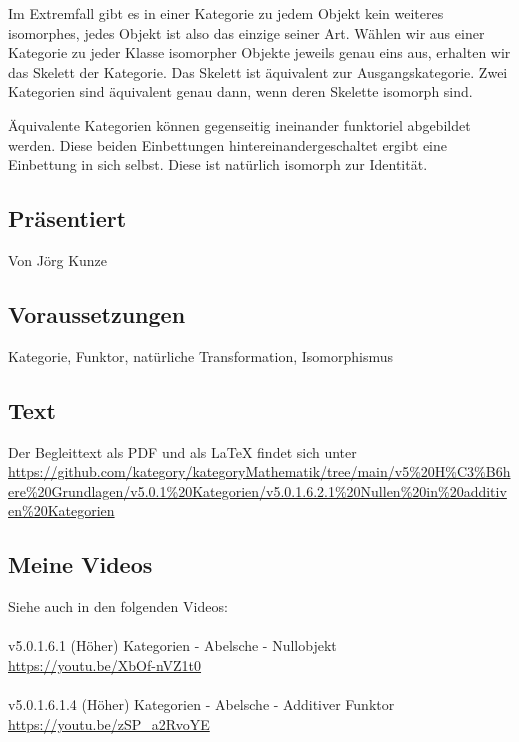\documentclass[a4paper]{amsart}
\theoremstyle{definition}
\begin{document}
Im Extremfall gibt es in einer Kategorie zu jedem Objekt kein weiteres isomorphes, jedes Objekt ist also das einzige seiner Art. Wählen wir aus einer Kategorie zu jeder Klasse isomorpher Objekte jeweils genau eins aus, erhalten wir das Skelett der Kategorie. Das Skelett ist äquivalent zur Ausgangskategorie. Zwei Kategorien sind äquivalent genau dann, wenn deren Skelette isomorph sind.

Äquivalente Kategorien können gegenseitig ineinander funktoriel abgebildet werden. Diese beiden Einbettungen hintereinandergeschaltet ergibt eine Einbettung in sich selbst. Diese ist natürlich isomorph zur Identität.

\subsection*{Präsentiert}
Von Jörg Kunze

\subsection*{Voraussetzungen}
Kategorie, Funktor, natürliche Transformation, Isomorphismus

\subsection*{Text}
Der Begleittext als PDF und als LaTeX findet sich unter
{\tiny
   \url{https://github.com/kategory/kategoryMathematik/tree/main/v5%20H%C3%B6here%20Grundlagen/v5.0.1%20Kategorien/v5.0.1.6.2.1%20Nullen%20in%20additiven%20Kategorien}
}

\subsection*{Meine Videos}
Siehe auch in den folgenden Videos:\\ 
\\
v5.0.1.6.1 (Höher) Kategorien - Abelsche - Nullobjekt\\
\url{https://youtu.be/XbOf-nVZ1t0}\\
\\
v5.0.1.6.1.4 (Höher) Kategorien - Abelsche - Additiver Funktor\\
\url{https://youtu.be/zSP_a2RvoYE}
\end{document}
